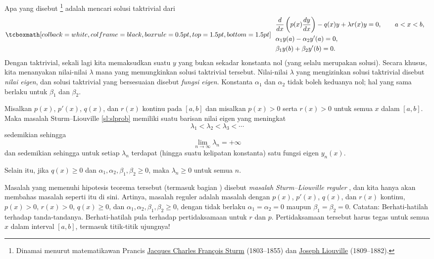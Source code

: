 Apa yang disebut 
\emph{}%
\footnote{Dinamai menurut matematikawan Prancis
\href{https://en.wikipedia.org/wiki/Jacques_Charles_Fran\%C3\%A7ois_Sturm}{Jacques Charles Fran\c{c}ois Sturm}
(1803--1855) dan
\href{https://en.wikipedia.org/wiki/Liouville}{Joseph Liouville}
(1809--1882).} adalah mencari
solusi taktrivial dari
\begin{equation} \label{sl:slprob}
\mybxbg{~~
\begin{aligned}
&\frac{d}{dx} \left( p(x) \frac{dy}{dx} \right)
- q(x) y + \lambda r(x) y = 0, \qquad a < x < b, \\
&\alpha_1 y(a) - \alpha_2 y'(a) = 0, \\
&\beta_1 y(b) + \beta_2 y'(b) = 0.
\end{aligned}
~~}
\end{equation}
Dengan taktrivial, sekali lagi kita memaksudkan suatu $y$ yang bukan sekadar
konstanta nol (yang selalu merupakan solusi).
Secara khusus, kita menanyakan nilai-nilai $\lambda$ mana
yang memungkinkan solusi taktrivial tersebut.
Nilai-nilai $\lambda$ yang mengizinkan solusi taktrivial
disebut \emph{nilai eigen},
dan solusi taktrivial yang bersesuaian
disebut
\emph{fungsi eigen}.
Konstanta $\alpha_1$ dan $\alpha_2$
tidak boleh keduanya nol;
hal yang sama berlaku untuk
$\beta_1$ dan $\beta_2$.

\begin{theorem} \label{sl:slregthm}
Misalkan $p(x)$, $p'(x)$, $q(x)$, dan $r(x)$ kontinu pada $[a,b]$
dan misalkan $p(x) > 0$ serta $r(x) > 0$ untuk semua $x$ dalam $[a,b]$.
Maka masalah Sturm--Liouville \eqref{sl:slprob}
memiliki suatu barisan nilai eigen yang meningkat
\begin{equation*}
\lambda_1 < \lambda_2 < \lambda_3 < \cdots 
\end{equation*}
sedemikian sehingga
\begin{equation*}
\lim_{n \to \infty} \lambda_n = +\infty
\end{equation*}
dan sedemikian sehingga untuk setiap $\lambda_n$ terdapat (hingga suatu kelipatan konstanta)
satu fungsi eigen $y_n(x)$. 

Selain itu, jika $q(x) \geq 0$ dan $\alpha_1, \alpha_2, \beta_1, \beta_2 \geq 0$,
maka $\lambda_n \geq 0$ untuk semua $n$.
\end{theorem}

Masalah yang memenuhi hipotesis teorema tersebut
(termasuk bagian )
disebut
\emph{masalah Sturm--Liouville reguler}%
,
dan kita hanya akan membahas masalah seperti itu di sini.
Artinya, masalah reguler adalah masalah dengan
$p(x)$, $p'(x)$, $q(x)$, dan $r(x)$ kontinu, $p(x) > 0$, $r(x) > 0$,
$q(x) \geq 0$, dan $\alpha_1, \alpha_2, \beta_1, \beta_2 \geq 0$,
dengan tidak berlaku $\alpha_1=\alpha_2=0$
maupun
$\beta_1=\beta_2=0$.
Catatan: Berhati-hatilah terhadap tanda-tandanya.  Berhati-hatilah pula terhadap pertidaksamaan
untuk $r$ dan $p$.
Pertidaksamaan tersebut
harus tegas untuk semua $x$ dalam interval $[a,b]$, termasuk titik-titik ujungnya!

